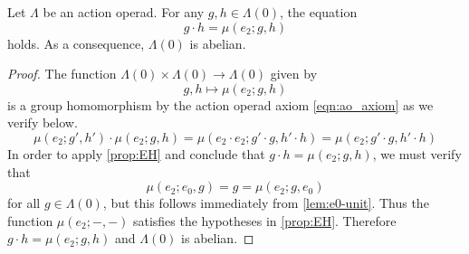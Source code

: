 \begin{cor}\label{cor:G0abel}
Let $\Lambda$ be an action operad. For any $g, h \in \Lambda(0)$, the equation
\[
g \cdot h = \mu(e_2; g,h)
\]
holds. As a consequence, $\Lambda(0)$ is abelian.
\end{cor}
\begin{proof}
The function $\Lambda(0) \times \Lambda(0) \to \Lambda(0)$ given by
\[
g, h \mapsto \mu(e_2; g, h)
\]
is a group homomorphism by the action operad axiom \cref{eqn:ao_axiom} as we verify below.
\[
\mu(e_2; g', h') \cdot \mu(e_2; g, h) = \mu(e_2 \cdot e_2; g' \cdot g, h' \cdot h) = \mu(e_2; g' \cdot g, h' \cdot h)
\]
In order to apply \cref{prop:EH} and conclude that $g \cdot h = \mu(e_2; g, h)$, we must verify that 
\[
\mu(e_2; e_0, g) = g = \mu(e_2; g, e_0)
\]
for all $g \in \Lambda(0)$, but this follows immediately from \cref{lem:e0-unit}.
Thus the function $\mu(e_2; -,-)$ satisfies the hypotheses in \cref{prop:EH}.
  Therefore $g \cdot h = \mu(e_2; g,h)$ and $\Lambda(0)$ is abelian.
\end{proof}

